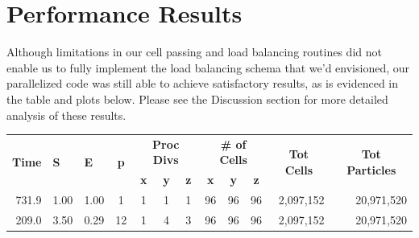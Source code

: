 \documentclass[]{article}
\begin{document}
\section{Performance Results}
Although limitations in our cell passing and load balancing routines did not enable us to fully implement the load balancing schema that we'd envisioned, our parallelized code was still able to achieve satisfactory results, as is evidenced in the table and plots below. Please see the Discussion section for more detailed analysis of these results.






\begin{table}[h!]
\centering
\begin{tabular}{|r|r|r|c|c|c|c|c|c|c|r|r|}
\hline
\multicolumn{1}{|c|}{\multirow{2}{*}{\textbf{Time}}} & \multicolumn{1}{l|}{\multirow{2}{*}{\textbf{S}}} & \multicolumn{1}{l|}{\multirow{2}{*}{\textbf{E}}} & \multirow{2}{*}{\textbf{p}} & \multicolumn{3}{c|}{\textbf{Proc Divs}} & \multicolumn{3}{c|}{\textbf{\# of Cells}} & \multicolumn{1}{c|}{\multirow{2}{*}{\textbf{Tot Cells}}} & \multicolumn{1}{c|}{\multirow{2}{*}{\textbf{Tot Particles}}} \\ \cline{5-10}
\multicolumn{1}{|c|}{}                               & \multicolumn{1}{l|}{}                            & \multicolumn{1}{l|}{}                            &                             & \textbf{x}  & \textbf{y}  & \textbf{z}  & \textbf{x}   & \textbf{y}   & \textbf{z}  & \multicolumn{1}{c|}{}                                    & \multicolumn{1}{c|}{}                                        \\ \hline
731.9                                                & 1.00                                             & 1.00                                             & 1                           & 1           & 1           & 1           & 96           & 96           & 96          & 2,097,152                                                & 20,971,520                                                   \\ \hline
209.0                                                & 3.50                                             & 0.29                                             & 12                          & 1           & 4           & 3           & 96           & 96           & 96          & 2,097,152                                                & 20,971,520                                                   \\ \hline

\end{tabular}
\end{table}
\end{document}
